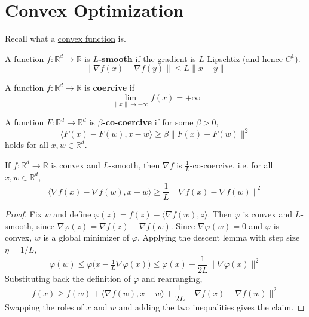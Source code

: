 \section{Convex Optimization} 

	Recall what a \hyperref[real-def:convex_functions]{convex function} is. 

	\begin{definition}[$L$-Smooth]
	  A function $f: \mathbb{R}^d \to \mathbb{R}$ is \textbf{$L$-smooth} if the gradient is $L$-Lipschtiz (and hence $C^1$). 
		\begin{equation}
		  \| \nabla f(x) - \nabla f(y) \| \leq L \|x - y\|
		\end{equation}
	\end{definition}

	\begin{definition}
	  A function $f: \mathbb{R}^d \to \mathbb{R}$ is \textbf{coercive} if 
		\begin{equation}
			\lim_{\|x\| \to +\infty} f(x) = +\infty
		\end{equation}
	\end{definition}

	\begin{definition}
		A function $F: \mathbb{R}^d \to \mathbb{R}^d$ is \textbf{$\beta$-co-coercive} if for some $\beta > 0$, 
		\begin{equation}
			\langle F(x) - F(w), x - w \rangle \geq \beta \|F(x) - F(w)\|^2
		\end{equation}
		holds for all $x, w \in \mathbb{R}^d$. 
	\end{definition}

	\begin{lemma}
		If $f: \mathbb{R}^d \to \mathbb{R}$ is convex and $L$-smooth, then $\nabla f$ is $\frac{1}{L}$-co-coercive, i.e. for all $x, w \in \mathbb{R}^d$, 
		\begin{equation}
			\langle \nabla f(x) - \nabla f(w), x - w \rangle \geq \frac{1}{L} \|\nabla f(x) - \nabla f(w)\|^2
		\end{equation}
	\end{lemma}
	\begin{proof}
		Fix $w$ and define $\varphi(z) = f(z) - \langle \nabla f(w), z \rangle$. Then $\varphi$ is convex and $L$-smooth, since $\nabla \varphi(z) = \nabla f(z) - \nabla f(w)$. Since $\nabla \varphi(w) = 0$ and $\varphi$ is convex, $w$ is a global minimizer of $\varphi$. Applying the descent lemma with step size $\eta = 1/L$, 
		\begin{equation}
			\varphi(w) \leq \varphi\big( x - \tfrac{1}{L} \nabla \varphi(x) \big) \leq \varphi(x) - \frac{1}{2L} \|\nabla \varphi(x)\|^2
		\end{equation}
		Substituting back the definition of $\varphi$ and rearranging, 
		\begin{equation}
			f(x) \geq f(w) + \langle \nabla f(w), x - w \rangle + \frac{1}{2L} \|\nabla f(x) - \nabla f(w)\|^2
		\end{equation}
		Swapping the roles of $x$ and $w$ and adding the two inequalities gives the claim. 
	\end{proof}

